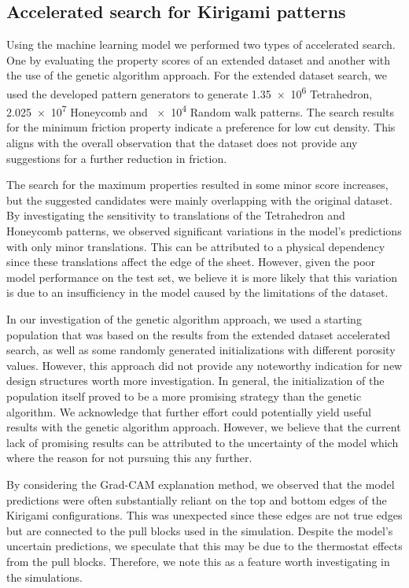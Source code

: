 \subsection{Accelerated search for Kirigami patterns}
Using the machine learning model we performed two types of accelerated search. One
by evaluating the property scores of an extended dataset and another with the
use of the genetic algorithm approach. For the extended dataset search, we used
the developed pattern generators to generate \num{1.35e6} Tetrahedron,
\num{2.025e7} Honeycomb and \num{e4} Random walk patterns. The search results
for the minimum friction property indicate a preference for low cut density. This aligns with the overall observation that the dataset does not
provide any suggestions for a further reduction in friction.

The search for the maximum properties resulted in some minor score increases, but
the suggested candidates were mainly overlapping with the original dataset. By investigating the sensitivity to translations of the Tetrahedron and Honeycomb patterns, we observed significant variations in the model's predictions with only minor translations. This can be attributed to a physical dependency since these translations affect the edge of the sheet. However, given the poor model performance on the test set, we believe it is more likely that this variation is due to an insufficiency in the model caused by the limitations of the dataset.

In our investigation of the genetic algorithm approach, we used a starting population that was based on the results from the extended dataset accelerated search, as well as some randomly generated initializations with different porosity values. However, this approach did not provide any noteworthy
indication for new design structures worth more investigation. In general, the
initialization of the population itself proved to be a more promising strategy
than the genetic algorithm. We acknowledge that further effort could potentially yield useful results with the genetic algorithm approach. However, we believe that the current lack of promising results can be attributed to the uncertainty of the model which where the reason for not pursuing this any further.

By considering the Grad-CAM explanation method, we observed that the model predictions were often substantially reliant on the top and bottom edges of the Kirigami configurations. This was unexpected since these edges are not true edges but are connected to the pull blocks used in the simulation. Despite the model's uncertain predictions, we speculate that this may be due to the thermostat effects from the pull blocks. Therefore, we note this as a feature worth investigating in the simulations.


